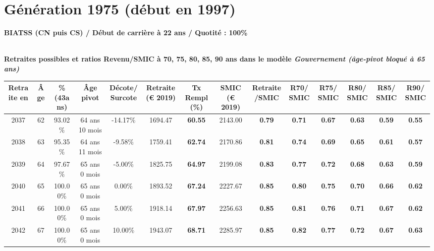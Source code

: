  \newpage 

\section{Génération 1975 (début en 1997)\label{BIATSS_100_1975_22_0}} 
 
{\bf \noindent BIATSS (CN puis CS) / Début de carrière à 22 ans / Quotité : 100\%}  ~ 

 ~\\{\bf \noindent Retraites possibles et ratios Revenu/SMIC à 70, 75, 80, 85, 90 ans dans le modèle \emph{Gouvernement (âge-pivot bloqué à 65 ans)}}  
 
\begin{adjustbox}{max width=\textwidth} 
\begin{tabular}[htb]{|c|c||c|c|c||c|c||c|c||c|c|c|c|c|} 
\hline 
 Retraite en &  Âge &  \%(43ans) &  Âge pivot &  Décote/Surcote &  Retraite (\euro{} 2019) &  Tx Rempl(\%) &  SMIC (\euro{} 2019) &  Retraite/SMIC &  R70/SMIC &  R75/SMIC &  R80/SMIC &  R85/SMIC &  R90/SMIC \\ 
\hline \hline 
 2037 &  62 &  93.02\% &  64 ans 10 mois &  -14.17\% &  1694.47 &  {\bf 60.55} &  2143.00 &  {\bf {\color{red} 0.79}} &  {\bf {\color{red} 0.71}} &  {\bf {\color{red} 0.67}} &  {\bf {\color{red} 0.63}} &  {\bf {\color{red} 0.59}} &  {\bf {\color{red} 0.55}} \\ 
\hline 
 2038 &  63 &  95.35\% &  64 ans 11 mois &  -9.58\% &  1759.41 &  {\bf 62.74} &  2170.86 &  {\bf {\color{red} 0.81}} &  {\bf {\color{red} 0.74}} &  {\bf {\color{red} 0.69}} &  {\bf {\color{red} 0.65}} &  {\bf {\color{red} 0.61}} &  {\bf {\color{red} 0.57}} \\ 
\hline 
 2039 &  64 &  97.67\% &  65 ans 0 mois &  -5.00\% &  1825.75 &  {\bf 64.97} &  2199.08 &  {\bf {\color{red} 0.83}} &  {\bf {\color{red} 0.77}} &  {\bf {\color{red} 0.72}} &  {\bf {\color{red} 0.68}} &  {\bf {\color{red} 0.63}} &  {\bf {\color{red} 0.59}} \\ 
\hline 
 2040 &  65 &  100.00\% &  65 ans 0 mois &  0.00\% &  1893.52 &  {\bf 67.24} &  2227.67 &  {\bf {\color{red} 0.85}} &  {\bf {\color{red} 0.80}} &  {\bf {\color{red} 0.75}} &  {\bf {\color{red} 0.70}} &  {\bf {\color{red} 0.66}} &  {\bf {\color{red} 0.62}} \\ 
\hline 
 2041 &  66 &  100.00\% &  65 ans 0 mois &  5.00\% &  1918.14 &  {\bf 67.97} &  2256.63 &  {\bf {\color{red} 0.85}} &  {\bf {\color{red} 0.81}} &  {\bf {\color{red} 0.76}} &  {\bf {\color{red} 0.71}} &  {\bf {\color{red} 0.67}} &  {\bf {\color{red} 0.62}} \\ 
\hline 
 2042 &  67 &  100.00\% &  65 ans 0 mois &  10.00\% &  1943.07 &  {\bf 68.71} &  2285.97 &  {\bf {\color{red} 0.85}} &  {\bf {\color{red} 0.82}} &  {\bf {\color{red} 0.77}} &  {\bf {\color{red} 0.72}} &  {\bf {\color{red} 0.67}} &  {\bf {\color{red} 0.63}} \\ 
\hline 
\hline 
\end{tabular} 
\end{adjustbox} 
 
